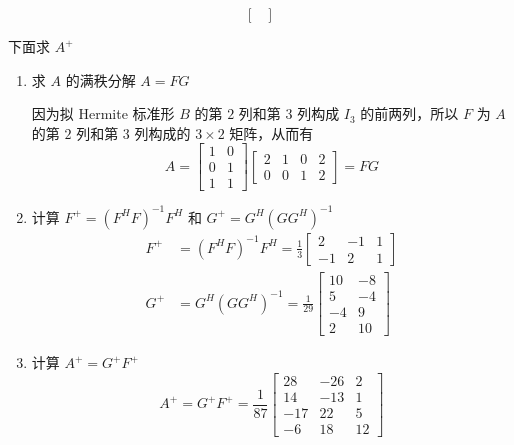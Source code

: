 \begin{solution}
\begin{enumerate}
\begin{equation*}
\begin{bmatrix}
                        \end{bmatrix}
                    \end{equation*}
                \end{enumerate}
                \par 下面求 $A^{+}$
                \begin{enumerate}
                    \item 求 $A$ 的满秩分解 $A = FG$
                        \par 因为拟 Hermite 标准形 $B$ 的第 $2$ 列和第 $3$ 列构成 $I_3$ 的前两列，所以 $F$ 为 $A$ 的第 $2$ 列和第 $3$ 列构成的 $3 \times 2$ 矩阵，从而有 
                        \begin{equation*}
                            A = \begin{bmatrix}
                                1 & 0 \\ 0 & 1 \\ 1 & 1
                            \end{bmatrix}\begin{bmatrix}
                                2 & 1 & 0 & 2 \\ 0 & 0 & 1 & 2
                            \end{bmatrix} = FG
                        \end{equation*}
                    \item 计算 $F^{+} = (F^HF)^{-1}F^H$ 和 $G^{+} = G^H(GG^H)^{-1}$
                        \begin{align*}
                            F^{+} &= (F^HF)^{-1}F^H = \frac{1}{3}\begin{bmatrix}
                                2 & -1 & 1 \\ -1 & 2 & 1
                            \end{bmatrix} \\ G^{+} &= G^H(GG^H)^{-1} = \frac{1}{29}\begin{bmatrix}
                                10 & -8 \\ 5 & -4 \\ -4 & 9 \\ 2 & 10
                            \end{bmatrix}
                        \end{align*} 
                    \item 计算 $A^{+} = G^{+}F^{+}$
                        \begin{equation*}
                            A^{+} = G^{+}F^{+} = \frac{1}{87}\begin{bmatrix}
                                28 & -26 & 2 \\ 14 & -13 & 1 \\ -17 & 22 & 5 \\ -6 & 18 & 12
                            \end{bmatrix}
                        \end{equation*}
                \end{enumerate}
        \end{solution}